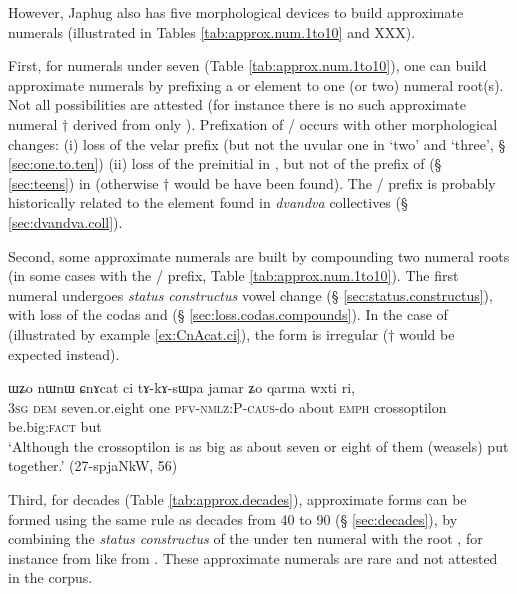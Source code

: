 However, Japhug also has five morphological devices to build approximate numerals (illustrated in Tables \ref{tab:approx.num.1to10} and XXX).

First, for numerals under seven (Table \ref{tab:approx.num.1to10}), one can build approximate numerals by prefixing a  or  element to one (or two) numeral root(s). Not all possibilities are attested (for instance there is no such approximate numeral $\dagger$ derived from only ).  Prefixation of  /  occurs with other morphological changes: (i) loss of the velar  prefix (but not the uvular one in `two' and `three', § \ref{sec:one.to.ten}) (ii) loss of the  preinitial in  , but not of the  prefix of  (§ \ref{sec:teens}) in  (otherwise $\dagger$ would be have been found). The  /  prefix is probably historically related to the  element found in \textit{dvandva} collectives (§ \ref{sec:dvandva.coll}).

Second, some approximate numerals are built by compounding two numeral roots (in some cases with the   /  prefix, Table \ref{tab:approx.num.1to10}). The first numeral undergoes \textit{status constructus} vowel change (§ \ref{sec:status.constructus}), with loss of the codas  and  (§ \ref{sec:loss.codas.compounds}). In the case of  (illustrated by example \ref{ex:CnAcat.ci}), the form  is irregular ($\dagger$ would be expected instead).

\begin{exe}
\ex \label{ex:CnAcat.ci} 
\gll ɯʑo nɯnɯ ɕnɤcat ci tɤ-kɤ-sɯpa jamar ʑo qarma wxti ri, \\
\textsc{3sg} \textsc{dem} seven.or.eight one \textsc{pfv}-\textsc{nmlz}:P-\textsc{caus}-do about \textsc{emph} crossoptilon be.big:\textsc{fact} but \\
\glt `Although the crossoptilon is as big as about seven or eight of them (weasels) put together.' (27-spjaNkW, 56)
\end{exe}

Third, for decades (Table \ref{tab:approx.decades}), approximate forms can be formed using the same rule as decades from 40 to 90 (§ \ref{sec:decades}), by combining the \textit{status constructus} of the under ten numeral with the root , for instance     from	  
 like  from . These approximate numerals are rare and not attested in the corpus.

